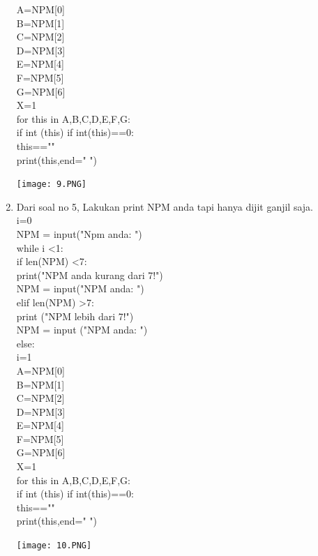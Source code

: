 \documentclass{article}
\begin{document}
\begin{enumerate}
A=NPM[0]\\
B=NPM[1]\\
C=NPM[2]\\
D=NPM[3]\\
E=NPM[4]\\
F=NPM[5]\\
G=NPM[6]\\

X=1\\

for this in A,B,C,D,E,F,G:\\
    
    if int (this)%
        if int(this)==0:\\
            this==""\\
        print(this,end=" ")\\
\begin{center}
    \texttt{[image: 9.PNG]}
\end{center}

\item Dari soal no 5, Lakukan print NPM anda tapi hanya dijit ganjil saja.\\
i=0\\
NPM = input("Npm anda: ")\\
while i <1:\\
    if len(NPM) <7:\\
        print("NPM anda kurang dari 7!")\\
        NPM = input("NPM anda: ")\\
    elif len(NPM) >7:\\
        print ("NPM lebih dari 7!")\\
        NPM = input ("NPM anda: ")\\
    else:\\
        i=1\\

A=NPM[0]\\
B=NPM[1]\\
C=NPM[2]\\
D=NPM[3]\\
E=NPM[4]\\
F=NPM[5]\\
G=NPM[6]\\

X=1\\

for this in A,B,C,D,E,F,G:\\
    
    if int (this)%
        if int(this)==0:\\
            this==""\\
        print(this,end=" ")\\
\begin{center}
    \texttt{[image: 10.PNG]}
\end{center}


\end{enumerate}
\end{document}
